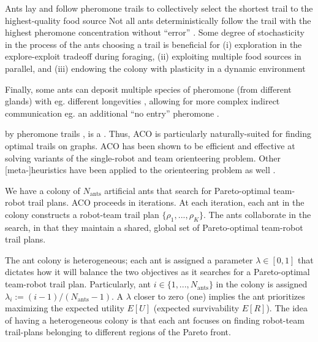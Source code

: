 \documentclass[11pt, oneside]{article}
\begin{document}
\begin{mybox}[label=box:qcmzifs, breakable]{Ants lay and follow pheromone trails to collectively select the shortest trail to the highest-quality food source}
Not all ants deterministically follow the trail with the highest pheromone concentration without ``error'' \cite{deneubourg1990self}.
Some degree of stochasticity in the process of the ants choosing a trail is beneficial for 
(i) exploration in the explore-exploit tradeoff during foraging, 
(ii) exploiting multiple food sources in parallel, 
and 
(iii) endowing the colony with plasticity in a dynamic environment \cite{deneubourg1983probabilistic,shiraishi2019diverse,deneubourg1986random,dussutour2009noise,edelstein1995trail}

Finally, some ants can deposit multiple species of pheromone (from different glands) with eg. different longevities \cite{czaczkes2015trail}, allowing for more complex indirect communication \cite{jackson2006communication} eg. an additional ``no entry'' pheromone \cite{robinson2005no}. 
\end{mybox}

by  pheromone trails \cite{bonabeau2000inspiration}, is a . 
 Thus, ACO is particularly naturally-suited for finding optimal trails on graphs. 
 ACO has been shown to be efficient and effective at solving variants of the single-robot \cite{chen2015multiobjective,verbeeck2017time} and team \cite{ke2008ants} orienteering problem. Other [meta-]heuristics have been applied to the orienteering problem as well \cite{dang2013effective,chao1996fast,butt1994heuristic}.

We have a colony of $N_{\text{ants}}$ artificial ants that search for Pareto-optimal team-robot trail plans. 
ACO proceeds in iterations. 
At each iteration, each ant in the colony constructs a robot-team trail plan $\{\rho_1, ..., \rho_K\}$. 
The ants collaborate in the search, in that they maintain a shared, global set of Pareto-optimal team-robot trail plans.

The ant colony is heterogeneous; each ant is assigned a parameter $\lambda \in [0, 1]$ that dictates how it will balance the two objectives as it searches for a Pareto-optimal team-robot trail plan. Particularly, ant $i\in\{1, ..., N_{\text{ants}}\}$ in the colony is assigned $\lambda_i := (i-1) / (N_{\text{ants}}-1)$. A $\lambda$ closer to zero (one) implies the ant prioritizes maximizing the expected utility $E[U]$ (expected survivability $E[R]$). The idea of having a heterogeneous colony is that each ant focuses on finding robot-team trail-plans belonging to different regions of the Pareto front. 
\end{document}
